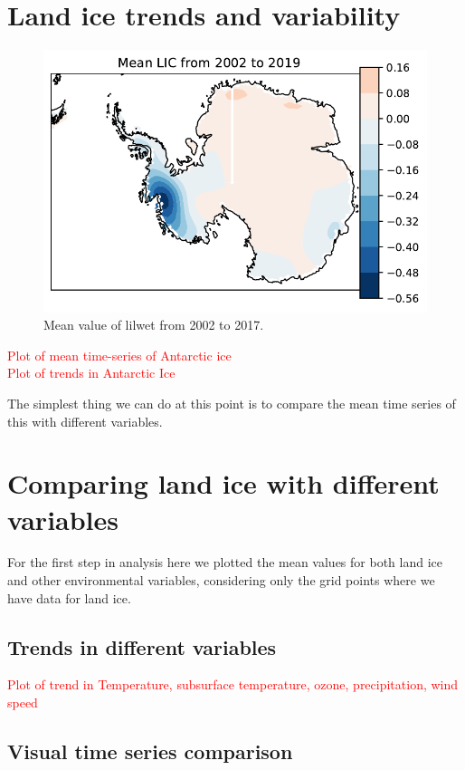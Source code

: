\documentclass[../main.tex]{subfiles}
\begin{document}
\section{Land ice trends and variability}
 \begin{figure}[H]
     \centering
     \includegraphics{images/2021w4/mean_spatial_plots2/hres/LIC}
     \caption{Mean value of \gls{lilwet} from 2002 to 2017.}
     \label{fig:lilwet_mean}
 \end{figure}
 
\textcolor{red}{Plot of mean time-series of Antarctic ice}\\
\textcolor{red}{Plot of trends in Antarctic Ice}

The simplest thing we can do at this point is to compare the mean time series of this with different variables.

\section{Comparing land ice with different variables}
For the first step in analysis here we plotted the mean values for both land ice and other environmental variables, considering only the grid points where we have data for land ice.

\subsection{Trends in different variables}
\textcolor{red}{Plot of trend in Temperature, subsurface temperature, ozone, precipitation, wind speed}

\subsection{Visual time series comparison}
\end{document}
